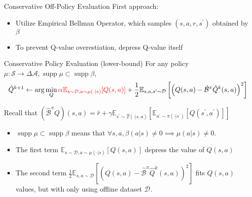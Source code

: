 \documentclass[11pt]{beamer}
\newcommand{\mbb}[1]{\mathbb{#1}}
\newcommand{\mc}[1]{\mathcal{#1}}
\newcommand{\supp}{\operatorname{supp}}
\begin{document}
\begin{frame}{Conservative Off-Policy Evaluation}
  First approach:
  \begin{itemize}
    \item Utilize Empirical Bellman Operator, which samples $(s,a,r,s^\prime)$ obtained by $\beta$
    \item To prevent Q-value overestiation, depress Q-value itself
  \end{itemize}

  \begin{block}{Conservative Policy Evaluation (lower-bound)}
    For any policy $\mu : \mc{S} \to \Delta{\mc{A}}, \supp \mu \subset \supp \beta$,
    \[
      \hat{Q}^{k+1} \leftarrow \arg \min_{Q} \textcolor{red}{\alpha \mbb{E}_{s \sim \mc{D}, a \sim \mu(\cdot|s)}[Q(s,a)]} + \frac{1}{2} \mbb{E}_{s,a, s^\prime \sim \mc{D}} \left[\left(Q(s,a) - \hat{\mc{B}}^\pi \hat{Q}^k (s,a)\right)^2\right]
    \]

    Recall that $ (\hat{\mc{B}}^\pi Q)(s,a) = \hat{r} + \gamma \mbb{E}_{s^\prime \sim \hat{T}(\cdot | s,a)}\left[\mbb{E}_{a^\prime \sim \pi(\cdot |s^\prime)} \left[ Q(s^\prime,a^\prime) \right]\right]$
  \end{block}

  \begin{itemize}
    \item $\supp \mu \subset \supp \beta$ means that $\forall s,a, \beta(a|s) \neq 0 \implies \mu(a|s)\neq 0$.
    \item The first term $\mbb{E}_{s \sim \mc{D}, a \sim \mu(\cdot|s)}[Q(s,a)]$ depress the value of $Q(s,a)$
    \item The second term $\frac{1}{2} \mbb{E}_{s,a \sim \mc{D}} \left[\left(Q(s,a) - \hat{\mc{B}}^\pi \hat{Q}^k (s,a)\right)^2\right]$ fits $Q(s,a)$ values, but with only using offline dataset $\mc{D}$.

  \end{itemize}
\end{frame}
\end{document}
